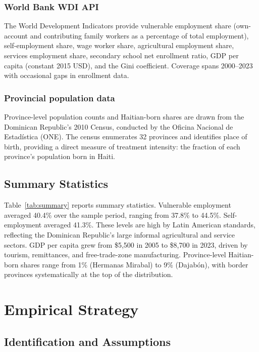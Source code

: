 \documentclass[12pt]{article}
\begin{document}
\subsubsection*{World Bank WDI API}
The World Development Indicators provide vulnerable employment share (own-account and contributing family workers as a percentage of total employment), self-employment share, wage worker share, agricultural employment share, services employment share, secondary school net enrollment ratio, GDP per capita (constant 2015 USD), and the Gini coefficient. Coverage spans 2000--2023 with occasional gaps in enrollment data.

\subsubsection*{Provincial population data}
Province-level population counts and Haitian-born shares are drawn from the Dominican Republic's 2010 Census, conducted by the Oficina Nacional de Estad\'{i}stica (ONE). The census enumerates 32 provinces and identifies place of birth, providing a direct measure of treatment intensity: the fraction of each province's population born in Haiti.

\subsection{Summary Statistics}



Table~\ref{tab:summary} reports summary statistics. Vulnerable employment averaged 40.4\% over the sample period, ranging from 37.8\% to 44.5\%. Self-employment averaged 41.3\%. These levels are high by Latin American standards, reflecting the Dominican Republic's large informal agricultural and service sectors. GDP per capita grew from \$5,500 in 2005 to \$8,700 in 2023, driven by tourism, remittances, and free-trade-zone manufacturing. Province-level Haitian-born shares range from 1\% (Hermanas Mirabal) to 9\% (Dajab\'{o}n), with border provinces systematically at the top of the distribution.

\section{Empirical Strategy}

\subsection{Identification and Assumptions}
\end{document}
